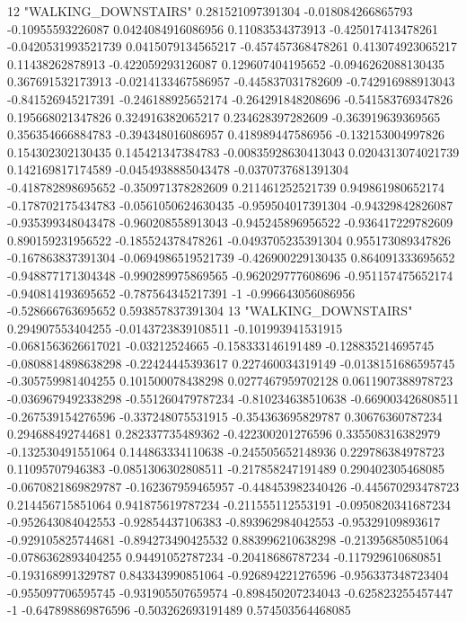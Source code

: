 12 "WALKING_DOWNSTAIRS" 0.281521097391304 -0.018084266865793 -0.10955593226087 0.0424084916086956 0.11083534373913 -0.425017413478261 -0.0420531993521739 0.0415079134565217 -0.457457368478261 0.413074923065217 0.11438262878913 -0.422059293126087 0.129607404195652 -0.0946262088130435 0.367691532173913 -0.0214133467586957 -0.445837031782609 -0.742916988913043 -0.841526945217391 -0.246188925652174 -0.264291848208696 -0.541583769347826 0.195668021347826 0.324916382065217 0.234628397282609 -0.363919639369565 0.356354666884783 -0.394348016086957 0.418989447586956 -0.132153004997826 0.154302302130435 0.145421347384783 -0.00835928630413043 0.0204313074021739 0.142169817174589 -0.0454938885043478 -0.0370737681391304 -0.418782898695652 -0.350971378282609 0.211461252521739 0.949861980652174 -0.178702175434783 -0.0561050624630435 -0.959504017391304 -0.94329842826087 -0.935399348043478 -0.960208558913043 -0.945245896956522 -0.936417229782609 0.890159231956522 -0.185524378478261 -0.0493705235391304 0.955173089347826 -0.167863837391304 -0.0694986519521739 -0.426900229130435 0.864091333695652 -0.948877171304348 -0.990289975869565 -0.962029777608696 -0.951157475652174 -0.940814193695652 -0.787564345217391 -1 -0.996643056086956 -0.528666763695652 0.593857837391304
13 "WALKING_DOWNSTAIRS" 0.294907553404255 -0.0143723839108511 -0.101993941531915 -0.0681563626617021 -0.03212524665 -0.158333146191489 -0.128835214695745 -0.0808814898638298 -0.22424445393617 0.227460034319149 -0.0138151686595745 -0.305759981404255 0.101500078438298 0.0277467959702128 0.0611907388978723 -0.0369679492338298 -0.551260479787234 -0.810234638510638 -0.669003426808511 -0.267539154276596 -0.337248075531915 -0.354363695829787 0.30676360787234 0.294688492744681 0.282337735489362 -0.422300201276596 0.335508316382979 -0.132530491551064 0.144863334110638 -0.245505652148936 0.229786384978723 0.11095707946383 -0.0851306302808511 -0.217858247191489 0.290402305468085 -0.0670821869829787 -0.162367959465957 -0.448453982340426 -0.445670293478723 0.214456715851064 0.941875619787234 -0.211555112553191 -0.0950820341687234 -0.952643084042553 -0.92854437106383 -0.893962984042553 -0.95329109893617 -0.929105825744681 -0.894273490425532 0.883996210638298 -0.213956850851064 -0.0786362893404255 0.94491052787234 -0.20418686787234 -0.117929610680851 -0.193168991329787 0.843343990851064 -0.926894221276596 -0.956337348723404 -0.955097706595745 -0.931905507659574 -0.898450207234043 -0.625823255457447 -1 -0.647898869876596 -0.503262693191489 0.574503564468085
